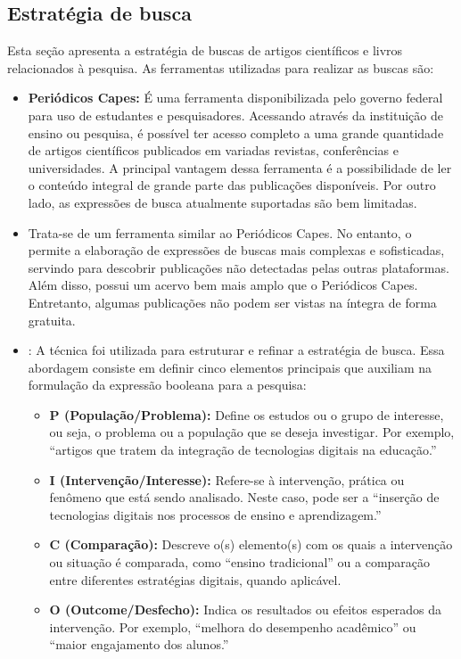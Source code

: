 \subsection{Estratégia de busca}
Esta seção apresenta a estratégia de buscas de artigos científicos e livros relacionados à pesquisa. As ferramentas utilizadas para realizar as buscas são:
\begin{itemize}
    \item \textbf{Periódicos Capes:} É uma ferramenta disponibilizada pelo governo federal para uso de estudantes e pesquisadores. Acessando através da instituição de ensino ou pesquisa, é possível ter acesso completo a uma grande quantidade de artigos científicos publicados em variadas revistas, conferências e universidades. A principal vantagem dessa ferramenta é a possibilidade de ler o conteúdo integral de grande parte das publicações disponíveis. Por outro lado, as expressões de busca atualmente suportadas são bem limitadas.
    \item \textbf{} Trata-se de um ferramenta similar ao Periódicos Capes. No entanto, o  permite a elaboração de expressões de buscas mais complexas e sofisticadas, servindo para descobrir publicações não detectadas pelas outras plataformas. Além disso, possui um acervo bem mais amplo que o Periódicos Capes. Entretanto, algumas publicações não podem ser vistas na íntegra de forma gratuita.
    \item \textbf{}: A técnica  foi utilizada para estruturar e refinar a estratégia de busca. Essa abordagem consiste em definir cinco elementos principais que auxiliam na formulação da expressão booleana para a pesquisa:
\begin{itemize}
    \item \textbf{P (População/Problema):} Define os estudos ou o grupo de interesse, ou seja, o problema ou a população que se deseja investigar. Por exemplo, “artigos que tratem da integração de tecnologias digitais na educação.”
    \item \textbf{I (Intervenção/Interesse):} Refere-se à intervenção, prática ou fenômeno que está sendo analisado. Neste caso, pode ser a “inserção de tecnologias digitais nos processos de ensino e aprendizagem.”
    \item \textbf{C (Comparação):} Descreve o(s) elemento(s) com os quais a intervenção ou situação é comparada, como “ensino tradicional” ou a comparação entre diferentes estratégias digitais, quando aplicável.
    \item \textbf{O (Outcome/Desfecho):} Indica os resultados ou efeitos esperados da intervenção. Por exemplo, “melhora do desempenho acadêmico” ou “maior engajamento dos alunos.”

\end{itemize}
\end{itemize}
